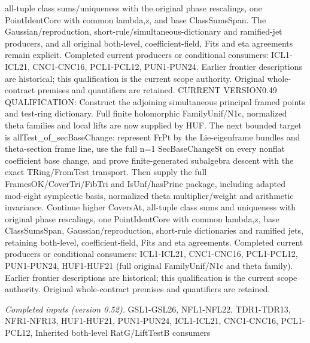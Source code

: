 all-tuple class sums/uniqueness with the original phase rescalings, one PointIdentCore with common lambda,z, and base ClassSumsSpan. The Gaussian/reproduction, short-rule/simultaneous-dictionary and ramified-jet producers, and all original both-level, coefficient-field, Fits and eta agreements remain explicit. Completed current producers or conditional consumers: ICL1-ICL21, CNC1-CNC16, PCL1-PCL12, PUN1-PUN24. Earlier frontier descriptions are historical; this qualification is the current scope authority. Original whole-contract premises and quantifiers are retained. CURRENT VERSION0.49 QUALIFICATION: Construct the adjoining simultaneous principal framed points and test-ring dictionary. Full finite holomorphic FamilyUnif/N1c, normalized theta families and local lifts are now supplied by HUF. The next bounded target is allTest\_\allowbreak of\_\allowbreak secBaseChange: represent FrPt by the Lie-eigenframe bundles and theta-section frame line, use the full n=1 SecBaseChangeSt on every nonflat coefficient base change, and prove finite-generated subalgebra descent with the exact TRing/FromTest transport. Then supply the full FramesOK/CoverTri/FibTri and IsUnf/hasPrinc package, including adapted mod-eight symplectic basis, normalized theta multiplier/weight and arithmetic invariance. Continue higher CoversAt, all-tuple class sums and uniqueness with original phase rescalings, one PointIdentCore with common lambda,z, base ClassSumsSpan, Gaussian/reproduction, short-rule dictionaries and ramified jets, retaining both-level, coefficient-field, Fits and eta agreements. Completed current producers or conditional consumers: ICL1-ICL21, CNC1-CNC16, PCL1-PCL12, PUN1-PUN24, HUF1-HUF21 (full original FamilyUnif/N1c and theta family). Earlier frontier descriptions are historical; this qualification is the current scope authority. Original whole-contract premises and quantifiers are retained.

\emph{Completed inputs (version 0.52).} GSL1-GSL26, NFL1-NFL22, TDR1-TDR13, NFR1-NFR13, HUF1-HUF21, PUN1-PUN24, ICL1-ICL21, CNC1-CNC16, PCL1-PCL12, Inherited both-level RatG/LiftTestB consumers

